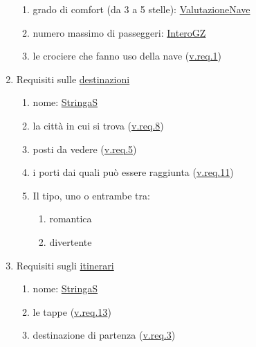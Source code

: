 \documentclass{article}
\begin{document}
\begin{enumerate}
\begin{enumerate}
        \item grado di comfort (da 3 a 5 stelle): \hyperref[sec:ValutazioneNave]{ValutazioneNave}\label{sec:RequisitiNaveGradoDiComfort}
        \item numero massimo di passeggeri: \hyperref[sec:InteroGZ]{InteroGZ}\label{sec:RequisitiNaveNumeroMassimoDiPasseggeri}
        \item le crociere che fanno uso della nave (\hyperref[sec:RequisitiCrociera]{\hyperref[sec:RequisitiCrociera]{v.req.1}})\label{sec:RequisitiNaveCrociere}
    \end{enumerate}
    \item Requisiti sulle \hyperref[sec:Destinazione]{destinazioni}\label{sec:RequisitiDestinazione}
    \begin{enumerate}
        \item nome: \hyperref[sec:StringaS]{StringaS}\label{sec:RequisitiDestinazioneNome}
        \item la città in cui si trova (\hyperref[sec:RequisitiCittà]{v.req.8})\label{sec:RequisitiDestinazioneCittà}
        \item posti da vedere (\hyperref[sec:RequisitiPostoDaVedere]{v.req.5})\label{sec:RequisitiDestinazionePostiDaVedere}
        \item i porti dai quali può essere raggiunta (\hyperref[sec:RequisitiPorto]{v.req.11})\label{sec:RequisitiDestinazionePorti}
        \item Il tipo, uno o entrambe tra:\label{sec:RequisitiDestinazioneTipo}
        \begin{enumerate}
            \item romantica\label{sec:RequisitiDestinazioneTipoRomantica}
            \item divertente\label{sec:RequisitiDestinazioneTipoDivertente}
        \end{enumerate}
    \end{enumerate}
    \item Requisiti sugli \hyperref[sec:Itinerario]{itinerari}\label{sec:RequisitiItinerario}
    \begin{enumerate}
        \item nome: \hyperref[sec:StringaS]{StringaS}\label{sec:RequisitiItinerarioNome}
        \item le tappe (\hyperref[sec:RequisitiTappa]{v.req.13})\label{sec:RequisitiItinerarioTappe}
        \item destinazione di partenza (\hyperref[sec:RequisitiDestinazione]{v.req.3})\label{sec:RequisitiItinerarioDestinazioneDiPartenza}

\end{enumerate}
\end{enumerate}
\end{document}

